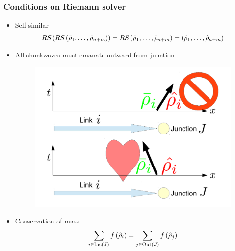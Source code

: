 \begin{frame}
\frametitle{Conditions on Riemann solver}

\begin{itemize}
    \item<1-> Self-similar
    \[
RS\left(RS\left(\bar{\rho}_{1},\ldots,\bar{\rho}_{n+m}\right)\right)=RS\left(\bar{\rho}_{1},\ldots,\bar{\rho}_{n+m}\right)=\left(\hat{\rho}_{1},\ldots,\hat{\rho}_{n+m}\right)
\]
    \item<2-> All shockwaves must emanate outward from junction
    \begin{figure}
    \includegraphics[width=.5\columnwidth]{figs-gen/shock}
    \end{figure}
    \item<3-> Conservation of mass
    \[
\sum_{i\in\text{Inc}\left(J\right)}f\left(\hat{\rho}_{i}\right)=\sum_{j\in\text{Out}\left(J\right)}f\left(\hat{\rho}_{j}\right)
\]
\end{itemize}

\end{frame}


